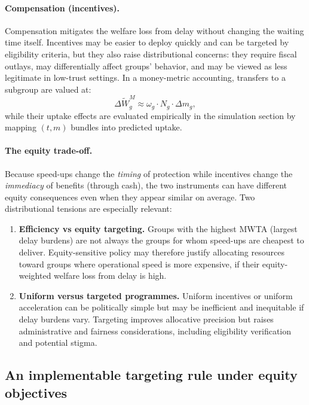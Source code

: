 \documentclass[doublespacing]{utdthesis}
\begin{document}
\paragraph{Compensation (incentives).}
Compensation mitigates the welfare loss from delay without changing the waiting time itself. Incentives may be easier to deploy quickly and can be targeted by eligibility criteria, but they also raise distributional concerns: they require fiscal outlays, may differentially affect groups’ behavior, and may be viewed as less legitimate in low-trust settings. In a money-metric accounting, transfers to a subgroup are valued at:
\begin{equation}
\Delta \widetilde{W}^{M}_g \approx \omega_g \cdot N_g \cdot \Delta m_g,
\label{eq:equity_incentive_gain}
\end{equation}
while their uptake effects are evaluated empirically in the simulation section by mapping $(t,m)$ bundles into predicted uptake.

\paragraph{The equity trade-off.}
Because speed-ups change the \emph{timing} of protection while incentives change the \emph{immediacy} of benefits (through cash), the two instruments can have different equity consequences even when they appear similar on average. Two distributional tensions are especially relevant:

\begin{enumerate}
\item \textbf{Efficiency vs equity targeting.} Groups with the highest MWTA (largest delay burdens) are not always the groups for whom speed-ups are cheapest to deliver. Equity-sensitive policy may therefore justify allocating resources toward groups where operational speed is more expensive, if their equity-weighted welfare loss from delay is high.
\item \textbf{Uniform versus targeted programmes.} Uniform incentives or uniform acceleration can be politically simple but may be inefficient and inequitable if delay burdens vary. Targeting improves allocative precision but raises administrative and fairness considerations, including eligibility verification and potential stigma.
\end{enumerate}

\subsection{An implementable targeting rule under equity objectives}
\label{subsec:essay3_target_rule}
\end{document}
